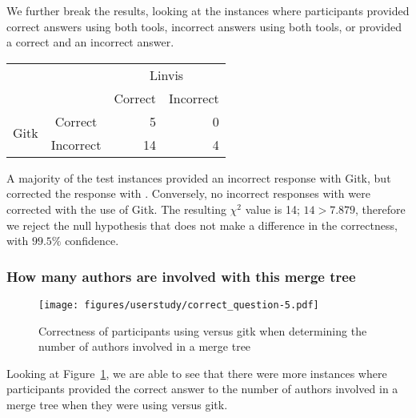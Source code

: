 We further break the results, looking at the instances where
participants provided correct answers using both tools, incorrect
answers using both tools, or provided a correct and an incorrect answer.




\begin{center}
  \begin{tabular}{cc|rr}
                           &           & \multicolumn{2}{c}{Linvis}\\
                           &           & Correct                      & Incorrect\\\hline
    \multirow{2}{*}{Gitk}  & Correct   & 5                            & 0\\
                           & Incorrect & 14                           & 4\\
  \end{tabular}
\end{center}

A majority of the test instances provided an incorrect response with
Gitk, but corrected the response with \tool. Conversely, no incorrect
responses with \tool were corrected with the use of Gitk. The resulting
$\chi^2$ value is 14; $14 > 7.879$, therefore we reject the null
hypothesis that \tool does not make a difference in the correctness,
with $99.5\%$ confidence.

\subsubsection{How many authors are involved with this merge tree}
\label{ssub:how_many_authors_are_involved_with_this_merge_tree}

\begin{figure}[htpb]
  \centering
  \texttt{[image: figures/userstudy/correct\_question-5.pdf]}
  \caption{Correctness of participants using \tool versus gitk when
    determining the number of authors involved in a merge tree}
  \label{fig:q_5_correctness}
\end{figure}

Looking at Figure~\ref{fig:q_5_correctness}, we are able to see that
there were more instances where participants provided the correct answer
to the number of authors involved in a merge tree when they were using
\tool versus gitk.


